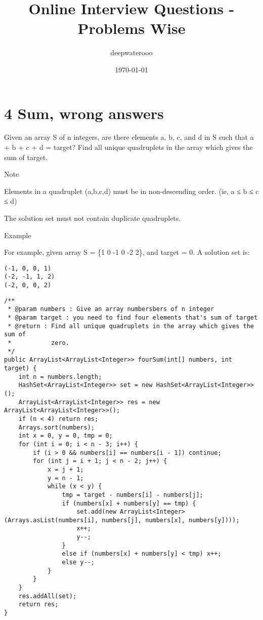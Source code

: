 \documentclass[12pt]{book}
\author{deepwaterooo}
\date{\today}
\title{Online Interview Questions - Problems Wise}
\begin{document}
\maketitle
\tableofcontents


\chapter{4 Sum, wrong answers}
\label{sec-1}

Given an array S of n integers, are there elements a, b, c, and d in S such that a + b + c + d = target? Find all unique quadruplets in the array which gives the sum of target.

Note

Elements in a quadruplet (a,b,c,d) must be in non-descending order. (ie, a ≤ b ≤ c ≤ d)

The solution set must not contain duplicate quadruplets.

Example

For example, given array S = \{1 0 -1 0 -2 2\}, and target = 0. A solution set is:
\lstset{language=java,label= ,caption= ,numbers=none}
\begin{lstlisting}
(-1, 0, 0, 1)
(-2, -1, 1, 2)
(-2, 0, 0, 2)
\end{lstlisting}
\lstset{language=java,label= ,caption= ,numbers=none}
\begin{lstlisting}
/**
 * @param numbers : Give an array numbersbers of n integer
 * @param target : you need to find four elements that's sum of target
 * @return : Find all unique quadruplets in the array which gives the sum of
 *           zero.
 */
public ArrayList<ArrayList<Integer>> fourSum(int[] numbers, int target) {     
    int n = numbers.length;
    HashSet<ArrayList<Integer>> set = new HashSet<ArrayList<Integer>>();
    ArrayList<ArrayList<Integer>> res = new ArrayList<ArrayList<Integer>>();
    if (n < 4) return res;
    Arrays.sort(numbers);
    int x = 0, y = 0, tmp = 0;
    for (int i = 0; i < n - 3; i++) {
        if (i > 0 && numbers[i] == numbers[i - 1]) continue;
        for (int j = i + 1; j < n - 2; j++) {
            x = j + 1;
            y = n - 1;
            while (x < y) {
                tmp = target - numbers[i] - numbers[j];
                if (numbers[x] + numbers[y] == tmp) {
                    set.add(new ArrayList<Integer>(Arrays.asList(numbers[i], numbers[j], numbers[x], numbers[y])));
                    x++;
                    y--;
                }
                else if (numbers[x] + numbers[y] < tmp) x++;
                else y--;
            }
        }
    }
    res.addAll(set);
    return res;
}
\end{lstlisting}
\end{document}
